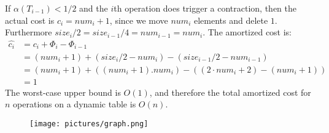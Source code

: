 If $\alpha(T_{i-1})<1/2$ and the $i$th operation does trigger a contraction,
then the actual cost is $c_i=num_i+1$, since we move $num_i$ elements and delete
$1$. Furthermore $size_i/2=size_{i-1}/4=num_{i-1}=num_i$. The amortized cost is:
\begin{align*}
  \hat{c_i}&=c_i+\Phi_i-\Phi_{i-1}\\
  &=(num_i+1)+(size_i/2-num_i)-(size_{i-1}/2-num_{i-1})\\
  &=(num_i+1)+((num_i+1).num_i)-((2\cdot num_i+2)-(num_i+1))\\
  &=1
\end{align*}
The worst-case upper bound is $O(1)$, and therefore the total amortized cost for
$n$ operations on a dynamic table is $O(n)$.
\begin{figure}[H]
  \texttt{[image: pictures/graph.png]}
\end{figure}
